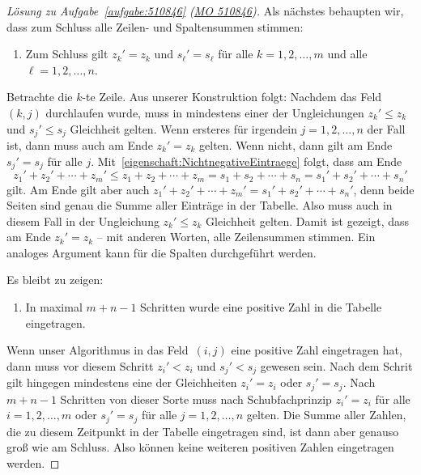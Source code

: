 \begin{proof}[Lösung zu Aufgabe~\ref{aufgabe:510846} \textmd{(\href{https://www.mathematik-olympiaden.de/moev/index.php?option=com_download&thema=a&format=raw&datei=A51084b.pdf}{MO 510846})}]
	Als nächstes behaupten wir, dass zum Schluss alle Zeilen- und Spaltensummen stimmen:
	\begin{enumerate}[resume,label={$(\arabic*)$},ref={$(\arabic*)$}]\itshape
		\item Zum Schluss gilt $z_k'=z_k$ und $s_\ell'=s_\ell$ für alle $k=1,2,\dotsc,m$ und alle $\ell=1,2,\dotsc,n$.\label{eigenschaft:RichtigeZeilenSpaltenSummen}
	\end{enumerate}
	Betrachte die $k$-te Zeile. Aus unserer Konstruktion folgt: Nachdem das Feld~$(k,j)$ durchlaufen wurde, muss in mindestens einer der Ungleichungen $z_k'\leqslant z_k$ und $s_j'\leqslant s_j$ Gleichheit gelten. Wenn ersteres für irgendein $j=1,2,\dotsc,n$ der Fall ist, dann muss auch am Ende $z_k'=z_k$ gelten. Wenn nicht, dann gilt am Ende $s_j'=s_j$ für alle $j$. Mit~\ref{eigenschaft:NichtnegativeEintraege} folgt, dass am Ende 
	\begin{equation*}
		z_1'+z_2'+\dotsb+z_m'\leqslant z_1+z_2+\dotsb+z_m=s_1+s_2+\dotsb+s_n=s_1'+s_2'+\dotsb+s_n'
	\end{equation*}
	gilt. Am Ende gilt aber auch $z_1'+z_2'+\dotsb+z_m'=s_1'+s_2'+\dotsb+s_n'$, denn beide Seiten sind genau die Summe aller Einträge in der Tabelle. Also muss auch in diesem Fall in der Ungleichung $z_k'\leqslant z_k$ Gleichheit gelten. Damit ist gezeigt, dass am Ende $z_k'=z_k$ -- mit anderen Worten, alle Zeilensummen stimmen. Ein analoges Argument kann für die Spalten durchgeführt werden.
	
	Es bleibt zu zeigen:
	\begin{enumerate}[resume,label={$(\arabic*)$},ref={$(\arabic*)$}]\itshape
		\item In maximal $m+n-1$ Schritten wurde eine positive Zahl in die Tabelle eingetragen.\label{eigenschaft:PositiveEintraege}
	\end{enumerate}
	Wenn unser Algorithmus in das Feld~$(i,j)$ eine positive Zahl eingetragen hat, dann muss vor diesem Schritt $z_i'<z_i$ und $s_j'<s_j$ gewesen sein. Nach dem Schrit gilt hingegen mindestens eine der Gleichheiten $z_i'=z_i$ oder $s_j'=s_j$. Nach $m+n-1$ Schritten von dieser Sorte muss nach Schubfachprinzip $z_i'=z_i$ für alle $i=1,2,\dotsc,m$ oder $s_j'=s_j$ für alle $j=1,2,\dotsc,n$ gelten. Die Summe aller Zahlen, die zu diesem Zeitpunkt in der Tabelle eingetragen sind, ist dann aber genauso groß wie am Schluss. Also können keine weiteren positiven Zahlen eingetragen werden.
\end{proof}

